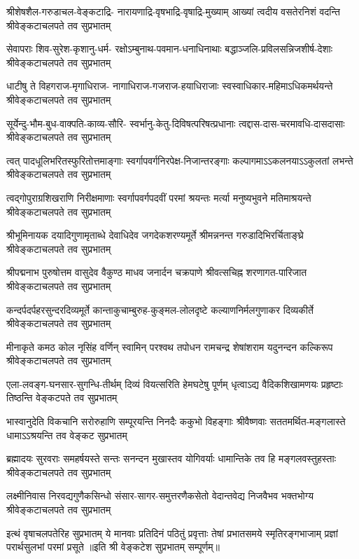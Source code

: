 \fourlineindentedshloka
{श्रीशेषशैल-गरुडाचल-वेङ्कटाद्रि-}
{नारायणाद्रि-वृषभाद्रि-वृषाद्रि-मुख्याम्}
{आख्यां त्वदीय वसतेरनिशं वदन्ति}
{श्रीवेङ्कटाचलपते तव सुप्रभातम्}

\fourlineindentedshloka
{सेवापराः शिव-सुरेश-कृशानु-धर्म-}
{रक्षोऽम्बुनाथ-पवमान-धनाधिनाथाः}
{बद्धाञ्जलि-प्रविलसन्निजशीर्ष-देशाः}
{श्रीवेङ्कटाचलपते तव सुप्रभातम्}

\fourlineindentedshloka
{धाटीषु ते विहगराज-मृगाधिराज-}
{नागाधिराज-गजराज-हयाधिराजाः}
{ स्वस्वाधिकार-महिमाऽधिकमर्थयन्ते}
{श्रीवेङ्कटाचलपते तव सुप्रभातम्}

\fourlineindentedshloka
{सूर्येन्दु-भौम-बुध-वाक्पति-काव्य-सौरि-}
{स्वर्भानु-केतु-दिविषत्परिषत्प्रधानाः}
{त्वद्दास-दास-चरमावधि-दासदासाः}
{श्रीवेङ्कटाचलपते तव सुप्रभातम्}

\fourlineindentedshloka
{त्वत् पादधूलिभरितस्फुरितोत्तमाङ्गाः}
{स्वर्गापवर्गनिरपेक्ष-निजान्तरङ्गाः}
{कल्पागमाऽऽकलनयाऽऽकुलतां लभन्ते}
{श्रीवेङ्कटाचलपते तव सुप्रभातम्}

\fourlineindentedshloka
{त्वद्गोपुराग्रशिखराणि निरीक्षमाणाः}
{स्वर्गापवर्गपदवीं परमां श्रयन्तः}
{मर्त्या मनुष्यभुवने मतिमाश्रयन्ते}
{श्रीवेङ्कटाचलपते तव सुप्रभातम्}

\fourlineindentedshloka
{श्रीभूमिनायक दयादिगुणामृताब्धे}
{देवाधिदेव जगदेकशरण्यमूर्ते}
{श्रीमन्ननन्त गरुडादिभिरर्चिताङ्घ्रे}
{श्रीवेङ्कटाचलपते तव सुप्रभातम्}

\fourlineindentedshloka
{श्रीपद्मनाभ पुरुषोत्तम वासुदेव}
{वैकुण्ठ माधव जनार्दन चक्रपाणे}
{श्रीवत्सचिह्न शरणागत-पारिजात}
{श्रीवेङ्कटाचलपते तव सुप्रभातम्}

\fourlineindentedshloka
{कन्दर्पदर्पहरसुन्दरदिव्यमूर्ते}
{कान्ताकुचाम्बुरुह-कुङ्मल-लोलदृष्टे}
{कल्याणनिर्मलगुणाकर दिव्यकीर्ते}
{श्रीवेङ्कटाचलपते तव सुप्रभातम्}

\fourlineindentedshloka
{मीनाकृते कमठ कोल नृसिंह वर्णिन्}
{स्वामिन् परश्वथ तपोधन रामचन्द्र}
{शेषांशराम यदुनन्दन कल्किरूप}
{श्रीवेङ्कटाचलपते तव सुप्रभातम्}

\fourlineindentedshloka
{एला-लवङ्ग-घनसार-सुगन्धि-तीर्थम्}
{दिव्यं वियत्सरिति हेमघटेषु पूर्णम्}
{धृत्वाऽद्य वैदिकशिखामणयः प्रहृष्टाः}
{तिष्ठन्ति वेङ्कटपते तव सुप्रभातम्}

\fourlineindentedshloka
{भास्वानुदेति विकचानि सरोरुहाणि}
{सम्पूरयन्ति निनदैः ककुभो विहङ्गाः}
{श्रीवैष्णवाः सततमर्थित-मङ्गलास्ते}
{धामाऽऽश्रयन्ति तव वेङ्कट सुप्रभातम्}

\fourlineindentedshloka
{ब्रह्मादयः सुरवराः समहर्षयस्ते}
{सन्तः सनन्दन मुखास्तव योगिवर्याः}
{धामान्तिके तव हि मङ्गलवस्तुहस्ताः}
{श्रीवेङ्कटाचलपते तव सुप्रभातम्}

\fourlineindentedshloka
{लक्ष्मीनिवास निरवद्यगुणैकसिन्धो}
{संसार-सागर-समुत्तरणैकसेतो}
{वेदान्तवेद्य निजवैभव भक्तभोग्य}
{श्रीवेङ्कटाचलपते तव सुप्रभातम्}

\fourlineindentedshloka
{इत्थं वृषाचलपतेरिह सुप्रभातम्}
{ये मानवाः प्रतिदिनं पठितुं प्रवृत्ताः}
{तेषां प्रभातसमये स्मृतिरङ्गभाजाम्}
{प्रज्ञां परार्थसुलभां परमां प्रसूते}
॥इति श्री वेङ्कटेश सुप्रभातम् सम्पूर्णम्॥